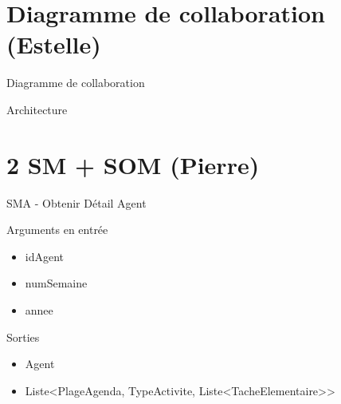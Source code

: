\documentclass[xetex]{beamer}
\begin{document}
    
    \section{Diagramme de collaboration (Estelle)}
    \begin{frame}{Diagramme de collaboration}
\noindent{}
    \end{frame}
    
    \begin{frame}{Architecture}
\noindent{}
    \end{frame}
    
\section{2 SM + SOM (Pierre)}

\begin{frame}{SMA - Obtenir Détail Agent}
\begin{small}
\noindent Arguments en entrée
\begin{itemize}
\item idAgent 
\item numSemaine 
\item annee  \\
\end{itemize}

\noindent Sorties
\begin{itemize}
\item Agent
\item Liste<PlageAgenda, TypeActivite, Liste<TacheElementaire>>
\end{itemize}
\end{small}

\end{frame}
\end{document}
